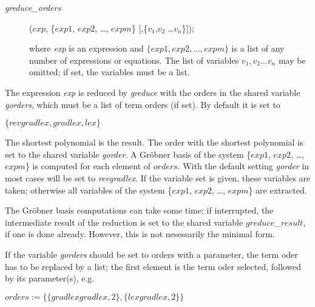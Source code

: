 \begin{description}
\item[{\it greduce\_orders}]($exp$, \{$exp1$, $exp2$, \ldots , $expm$\}
[,\{$v_1$,$v_2$ \ldots $v_n$\}]);

where {\it exp} is an expression and $\{exp1, exp2,\ldots , expm\}$ is
a list of any number of expressions or equations. The list of variables
$v_1,v_2 \ldots v_n$ may be omitted; if set, the variables must be a list.
\end{description}
 
The expression {\it exp} is reduced by {\it greduce} with the orders
in the shared variable {\it gorders}, which must be a list of term
orders (if set). By default it is set to

\begin{center}
$\{revgradlex,gradlex,lex\}$
\end{center}

The shortest polynomial is the result.
The order with the shortest polynomial is set to the shared variable
{\it gorder}. A Gr\"obner basis of the system \{$exp1$, $exp2$, \ldots ,
$expm$\} is computed for each element of $orders$.
With the default setting {\it gorder} in most cases will be set
to {\it revgradlex}.
If the variable set is given, these variables are taken; otherwise all
variables of the system \{$exp1$, $exp2$, \ldots , $expm$\} are
extracted.
 
The Gr\"obner basis computations can take some time; if interrupted, the
intermediate result of the reduction is set to the shared variable
$greduce$\_$result$, if one is done already. However, this is not
nesessarily the minimal form.
 
If the variable {\it gorders} should be set to orders with a parameter,
the term oder has to be replaced by a list; the first element is the
term oder selected, followed by its parameter(s), e.g.

\begin{center}
$orders:=\{\{gradlexgradlex,2\},\{lexgradlex,2\}\}$
\end{center}

